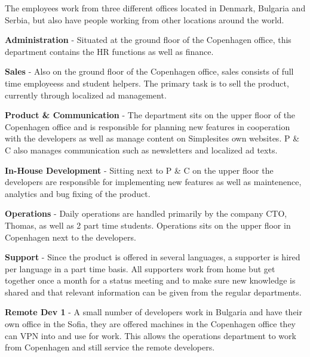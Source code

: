 The employees work from three different offices located in Denmark, Bulgaria and
Serbia, but also have people working from other locations around the world.

\begin{itemize*}
    \item \textbf{Administration} - Situated at the ground floor of the
          Copenhagen office, this department contains the HR functions as well
          as finance.

    \item \textbf{Sales} - Also on the ground floor of the Copenhagen office,
          sales consists of full time employeess and student helpers. The
          primary task is to sell the product, currently through localized ad
          management.

    \item \textbf{Product \& Communication} - The department
          sits on the upper floor of the Copenhagen office and is responsible
          for planning new features in cooperation with the developers as well
          as manage content on Simplesites own websites. P \& C also manages
          communication such as newsletters and localized ad texts.

    \item \textbf{In-House Development} - Sitting next to P \& C on the upper
          floor the developers are responsible for implementing new features as
          well as maintenence, analytics and bug fixing of the product.

    \item \textbf{Operations} - Daily operations are handled primarily by the
          company CTO, Thomas, as well as 2 part time students. Operations sits
          on the upper floor in Copenhagen next to the developers.

    \item \textbf{Support} - Since the product is offered in several languages,
          a supporter is hired per language in a part time basis. All supporters
          work from home but get together once a month for a status meeting and
          to make sure new knowledge is shared and that relevant information can
          be given from the regular departments.

    \item \textbf{Remote Dev 1} - A small number of developers work in
          Bulgaria and have their own office in the Sofia, they are offered
          machines in the Copenhagen office they can VPN into and use for work.
          This allows the operations department to work from Copenhagen and
          still service the remote developers.


\end{itemize*}
